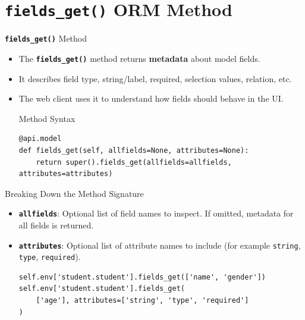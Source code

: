 
\section{\textbf{\texttt{fields\_get()}} ORM Method}

\begin{frame}[fragile]{\textbf{\texttt{fields\_get()}} Method}
	\begin{itemize}
		\item The \textbf{\texttt{fields\_get()}} method returns \textbf{metadata} about model fields.
		\item It describes field type, string/label, required, selection values, relation, etc.
		\item The web client uses it to understand how fields should behave in the UI.
\begin{block}{Method Syntax}
\begin{lstlisting}
@api.model
def fields_get(self, allfields=None, attributes=None):
	return super().fields_get(allfields=allfields, attributes=attributes)
\end{lstlisting}
\end{block}
	\end{itemize}
\end{frame}

\begin{frame}[fragile]{Breaking Down the Method Signature}
	\begin{block}{}
		\begin{itemize}
			\item \textbf{\texttt{allfields}}: Optional list of field names to inspect. If omitted, metadata for all fields is returned.
			\item \textbf{\texttt{attributes}}: Optional list of attribute names to include (for example \texttt{string}, \texttt{type}, \texttt{required}).
\begin{lstlisting}
self.env['student.student'].fields_get(['name', 'gender'])
self.env['student.student'].fields_get(
	['age'], attributes=['string', 'type', 'required']
)
\end{lstlisting}
		\end{itemize}
	\end{block}
\end{frame}

